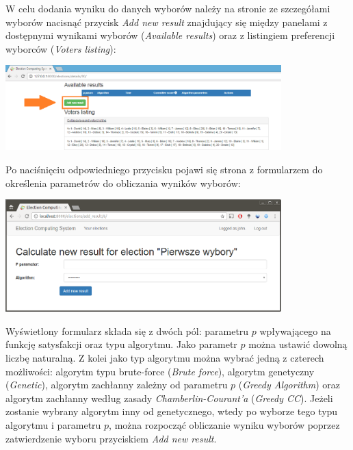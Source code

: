 \documentclass[pdflatex,11pt]{../aghdoc_version2}
\begin{document}
W celu dodania wyniku do danych wyborów należy na stronie ze szczegółami wyborów nacisnąć przycisk \textit{Add new result} znajdujący się między panelami z dostępnymi wynikami wyborów (\textit{Available results}) oraz z listingiem preferencji wyborców (\textit{Voters listing}): \\
\begin{center}
\includegraphics[width=0.8\textwidth]{pics/add_new_result_button.png}
\end{center}

\vspace{\baselineskip}
Po naciśnięciu odpowiedniego przycisku pojawi się strona z formularzem do określenia parametrów do obliczania wyników wyborów: \\
\begin{center}
\includegraphics[width=0.8\textwidth]{pics/new-result.png}
\end{center}

\vspace{\baselineskip}
Wyświetlony formularz składa się z dwóch pól: parametru $p$ wpływającego na funkcję satysfakcji oraz typu algorytmu. Jako parametr $p$ można ustawić dowolną liczbę naturalną. Z kolei jako typ algorytmu można wybrać jedną z czterech możliwości: algorytm typu brute-force (\textit{Brute force}), algorytm genetyczny (\textit{Genetic}), algorytm zachłanny zależny od parametru $p$ (\textit{Greedy Algorithm}) oraz algorytm zachłanny według zasady \textit{Chamberlin-Courant’a} (\textit{Greedy CC}). Jeżeli zostanie wybrany algorytm inny od genetycznego, wtedy po wyborze tego typu algorytmu i parametru $p$, można rozpocząć obliczanie wyniku wyborów poprzez zatwierdzenie wyboru przyciskiem \textit{Add new result}. 
\end{document}
